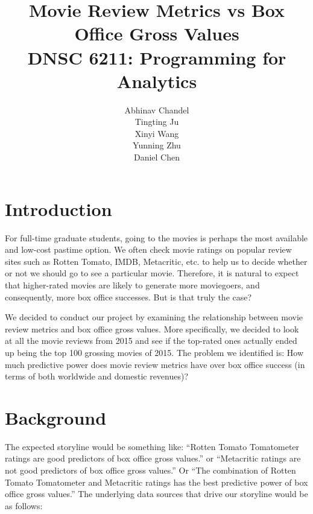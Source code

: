 \documentclass{article}
\title{Movie Review Metrics vs Box Office Gross Values\\ \small{DNSC 6211: Programming for Analytics}}
\author{
	Abhinav Chandel \\
	Tingting Ju \\
	Xinyi Wang \\
	Yunning Zhu \\
	Daniel Chen \\
}
\date{}
\begin{document}
\maketitle


\pagebreak
\tableofcontents


\pagebreak

%
%
\section{Introduction}
\label{introduction}

For full-time graduate students, going to the movies is perhaps the most available and low-cost pastime option.  We often check movie ratings on popular review sites such as Rotten Tomato, IMDB, Metacritic, etc.  to help us to decide whether or not we should go to see a particular movie.  Therefore, it is natural to expect that higher-rated movies are likely to generate more moviegoers, and consequently, more box office successes.  But is that truly the case?

We decided to conduct our project by examining the relationship between movie review metrics and box office gross values.  More specifically, we decided to look at all the movie reviews from 2015 and see if the top-rated ones actually ended up being the top 100 grossing movies of 2015.  The problem we identified is:  How much predictive power does movie review metrics have over box office success (in terms of both worldwide and domestic revenues)?

\section{Background}

The expected storyline would be something like: “Rotten Tomato Tomatometer ratings are good predictors of box office gross values.” or “Metacritic ratings are not good predictors of box office gross values.” Or “The combination of Rotten Tomato Tomatometer and Metacritic ratings has the best predictive power of box office gross values.”  The underlying data sources that drive our storyline would be as follows:
\end{document}

